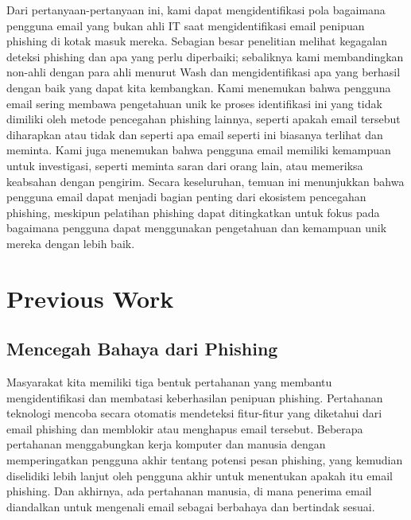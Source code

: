 \documentclass[lettersize,journal]{IEEEtran}
\begin{document}
Dari pertanyaan-pertanyaan ini, kami dapat mengidentifikasi pola bagaimana
pengguna email yang bukan ahli IT saat mengidentifikasi email penipuan phishing
di kotak masuk mereka. Sebagian besar penelitian melihat kegagalan deteksi
phishing dan apa yang perlu diperbaiki; sebaliknya kami membandingkan non-ahli
dengan para ahli menurut Wash dan mengidentifikasi apa yang berhasil dengan
baik yang dapat kita kembangkan. Kami menemukan bahwa pengguna email sering
membawa pengetahuan unik ke proses identifikasi ini yang tidak dimiliki oleh
metode pencegahan phishing lainnya, seperti apakah email tersebut diharapkan
atau tidak dan seperti apa email seperti ini biasanya terlihat dan meminta.
Kami juga menemukan bahwa pengguna email memiliki kemampuan untuk investigasi,
seperti meminta saran dari orang lain, atau memeriksa keabsahan dengan
pengirim. Secara keseluruhan, temuan ini menunjukkan bahwa pengguna email dapat
menjadi bagian penting dari ekosistem pencegahan phishing, meskipun pelatihan
phishing dapat ditingkatkan untuk fokus pada bagaimana pengguna dapat
menggunakan pengetahuan dan kemampuan unik mereka dengan lebih baik.

\section{Previous Work}

\subsection{Mencegah Bahaya dari Phishing}
Masyarakat kita memiliki tiga bentuk pertahanan yang membantu mengidentifikasi
dan membatasi keberhasilan penipuan phishing. Pertahanan teknologi mencoba
secara otomatis mendeteksi fitur-fitur yang diketahui dari email phishing dan
memblokir atau menghapus email tersebut. Beberapa pertahanan menggabungkan
kerja komputer dan manusia dengan memperingatkan pengguna akhir tentang potensi
pesan phishing, yang kemudian diselidiki lebih lanjut oleh pengguna akhir untuk
menentukan apakah itu email phishing. Dan akhirnya, ada pertahanan manusia, di
mana penerima email diandalkan untuk mengenali email sebagai berbahaya dan
bertindak sesuai.
\end{document}
